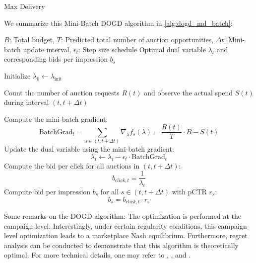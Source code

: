 \documentclass[../main.tex]{subfiles}
\begin{document}
\begin{section}{Max Delivery}
	
	We summarize this Mini-Batch DOGD algorithm in \autoref{alg:dogd_md_batch}:

	\begin{algorithm}[H]
		\caption{Mini-Batch DOGD for Max Delivery Problem}
		\label{alg:dogd_md_batch}
		\begin{algorithmic}[1]
			\Require $B$: Total budget, $T$: Predicted total number of auction opportunities, $\Delta t$: Mini-batch update interval, $\epsilon_t$: Step size schedule
			\Ensure Optimal dual variable $\lambda_t$ and corresponding bids per impression $b_s$
			
			\State Initialize $\lambda_0 \gets \lambda_{\text{init}}$ 
			
			 
			\State Count the number of auction requests \(R(t)\) and observe the actual spend $S(t)$ during interval \((t, t+\Delta t)\)
			
			\State Compute the mini-batch gradient:
			\[
			\text{BatchGrad}_t = \sum_{ s \in (t, t+\Delta t)} \nabla_{\lambda} f_s(\lambda) = \frac{R(t)}{T} \cdot B - S(t)
			\]
			\State Update the dual variable using the mini-batch gradient:
			\[
			\lambda_t \gets \lambda_t - \epsilon_t \cdot \text{BatchGrad}_t 
			\]
			\State Compute the bid per click for all auctions in \((t, t+\Delta t)\):
			\[
			b_{click, t} = \frac{1}{\lambda_t}
			\]
			\State Compute bid per impression $b_s$ for all $s \in (t, t+\Delta t)$ with pCTR $r_s$:
			\[
			b_s = b_{click, t} \cdot r_s
			\]
			\EndFor
		
		\end{algorithmic}
	\end{algorithm}
	
	
	Some remarks on the DOGD algorithm: The optimization is performed at the campaign level. Interestingly, under certain regularity conditions, this campaign-level optimization leads to a marketplace Nash equilibrium. Furthermore, regret analysis can be conducted to demonstrate that this algorithm is theoretically optimal. For more technical details, one may refer to \cite{balseiro2020dual}, \cite{balseiro2019learning}, and \cite{gao2022bidding}.
	
	

\end{section}
\end{document}
